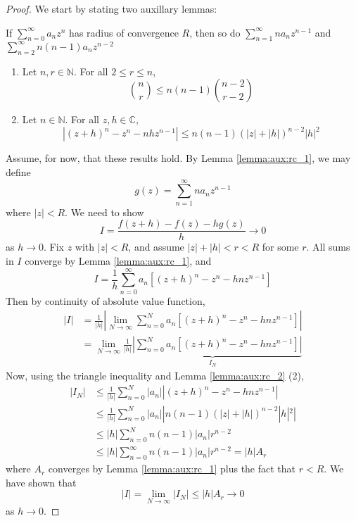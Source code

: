 \documentclass[10pt, a4paper, twoside]{report}
\begin{document}
\begin{proof} We start by stating two auxillary lemmas:
    \begin{lemma}
        If \(\sum_{n=0}^{\infty}a_nz^n\) has radius of convergence \(R\), then so do \(\sum_{n=1}^{\infty}na_nz^{n-1}\) \newline and  \(\sum_{n=2}^{\infty}n(n-1)a_nz^{n-2}\)
        \label{lemma:aux:rc_1}
    \end{lemma}
    \begin{lemma}\item[]
        \begin{enumerate} 
            \item Let \(n,r\in\mathbb{N}\). For all \( 2\leq r\leq n \),
            \[\binom nr\leq n(n-1)\binom{n-2}{r-2}\]
            \item Let \(n\in\mathbb{N}\). For all \(z,h\in\mathbb{C}\),
            \[|(z+h)^n-z^n-nhz^{n-1}|\leq n(n-1)(|z|+|h|)^{n-2}|h|^2\]
        \end{enumerate}
        \label{lemma:aux:rc_2}
    \end{lemma}
    Assume, for now, that these results hold. By Lemma \ref{lemma:aux:rc_1}, we may define 
    \[g(z)=\sum_{n=1}^{\infty}na_nz^{n-1}\]
    where \(|z|<R\). We need to show 
    \[I=\frac{f(z+h)-f(z)-hg(z)}{h}\to 0\]
    as \(h\to 0\). Fix \(z\) with \(|z|<R\), and assume \(|z|+|h|<r<R\) for some \(r\). All sums in \(I\) converge by Lemma \ref{lemma:aux:rc_1}, and 
    \[I=\frac 1h\sum_{n=0}^\infty a_n[(z+h)^n-z^n-hnz^{n-1}]\]
    Then by continuity of absolute value function,
    \begin{align*}
        |I|&=\frac 1{|h|}\left|\lim_{N\to\infty}\sum_{n=0}^{N} a_n[(z+h)^n-z^n-hnz^{n-1}]\right| \\
        &=\lim_{N\to\infty}\underbrace{\frac 1{|h|}\left|\sum_{n=0}^{N} a_n[(z+h)^n-z^n-hnz^{n-1}]\right|}_{I_N}
    \end{align*}
    Now, using the triangle inequality and Lemma \ref{lemma:aux:rc_2} (2), 
    \begin{align*}
        |I_N|&\leq\frac 1{|h|}\sum_{n=0}^{N}|a_n||(z+h)^n-z^n-hnz^{n-1}| \\
        &\leq\frac 1{|h|}\sum_{n=0}^{N}|a_n||n(n-1)(|z|+|h|)^{n-2}|h|^2| \\
        &\leq |h|\sum_{n=0}^{N}n(n-1)|a_n|r^{n-2} \\
        &\leq |h|\sum_{n=0}^\infty n(n-1)|a_n|r^{n-2} =|h|A_r
    \end{align*}
    where \(A_r\) converges by Lemma \ref{lemma:aux:rc_1} plus the fact that \(r<R\). We have shown that 
    \[|I|=\lim_{N\to\infty}|I_N|\leq|h|A_r\to 0\]
    as \(h\to 0\).
\end{proof}
\end{document}
